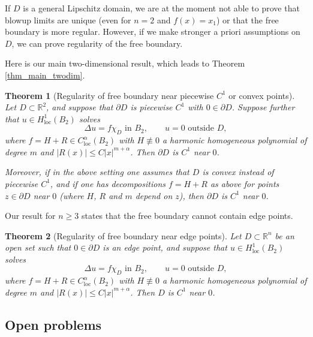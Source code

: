 \documentclass[11pt,a4paper]{amsart}
\newtheorem{Theorem}{Theorem}[section]
\theoremstyle{definition}
\numberwithin{equation}{section}
\newcommand{\mR}{\mathbb{R}}                    %
\newcommand{\p}{\partial}
\begin{document}
If $D$ is a general Lipschitz domain, we are at the moment not able to prove that blowup limits are unique (even for $n=2$ and $f(x) = x_1$) or that the free boundary is more regular. However, if we make stronger a priori assumptions on $D$, we can prove regularity of the free boundary.

Here is our main two-dimensional result, which leads to Theorem \ref{thm_main_twodim}.

\begin{Theorem}[Regularity of free boundary near piecewise $C^1$ or convex points] \label{thm_fb_2d}
Let $D \subset \mR^2$, and suppose
that $\partial D$ is piecewise $C^1$  with $0 \in \p D$. Suppose further  that $u \in H^1_{\mathrm{loc}}(B_2)$ solves 
\[
\Delta u = f \chi_D \text{ in $B_2$}, \qquad u=0 \text{ outside $D$},
\]
where $f = H + R \in C^{\alpha}_{\mathrm{loc}}(B_2)$ with $H \not\equiv 0$ a harmonic homogeneous polynomial of degree $m$ and $|R(x)| \leq C |x|^{m+\alpha}$. Then $\partial  D$ is $C^1$ near $0$.

Moreover, if in the above setting one assumes that $D$ is convex instead of piecewise $C^1$, and if one has decompositions $f = H + R$ as above for points $z \in \p D$ near $0$ (where $H$, $R$ and $m$ depend on $z$), then $\partial  D$ is $C^1$ near $0$.
\end{Theorem}




Our result for $n \geq 3$ states that the free boundary cannot contain edge points.

\begin{Theorem}[Regularity of free boundary near edge points] \label{thm_fb_polyhedron}
Let $D \subset \mR^n$ be an open set such that $0 \in \p D$ is an edge point, and suppose that $u \in H^1_{\mathrm{loc}}(B_2)$ solves 
\[
\Delta u = f \chi_D \text{ in $B_2$}, \qquad u=0 \text{ outside $D$},
\]
where $f = H + R \in C^{\alpha}_{\mathrm{loc}}(B_2)$ with $H \not\equiv 0$ a harmonic homogeneous polynomial of degree $m$ and $|R(x)| \leq C |x|^{m+\alpha}$. Then $D$ is $C^1$ near $0$.
\end{Theorem}


\subsection{Open problems}
\end{document}
